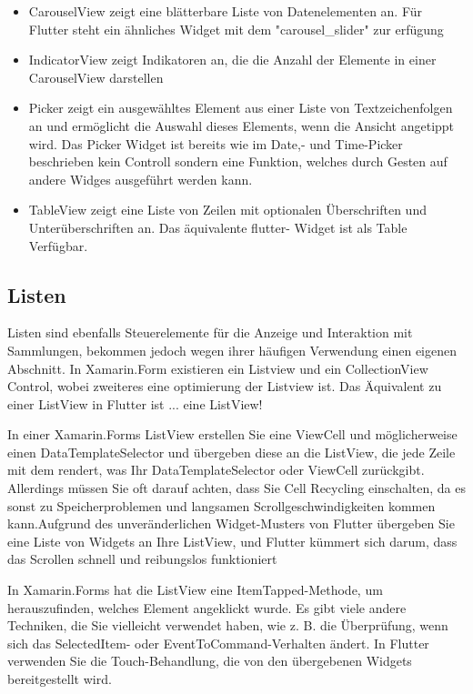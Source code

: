 \begin{itemize}
\setlength\itemsep{-0.6em}
 \item CarouselView zeigt eine blätterbare Liste von Datenelementen an.  Für Flutter steht ein ähnliches Widget mit dem "carousel\_slider" zur erfügung
 \item IndicatorView zeigt Indikatoren an, die die Anzahl der Elemente in einer CarouselView darstellen
 \item Picker zeigt ein ausgewähltes Element aus einer Liste von Textzeichenfolgen an und ermöglicht die Auswahl dieses Elements, wenn die Ansicht angetippt wird.  Das Picker Widget ist bereits wie im Date,- und Time-Picker beschrieben kein Controll sondern eine Funktion, welches durch Gesten auf andere Widges ausgeführt werden kann. 
 \item TableView zeigt eine Liste von Zeilen mit optionalen Überschriften und Unterüberschriften an.  Das äquivalente flutter- Widget ist als Table Verfügbar.
\end{itemize}

\subsection{Listen}

Listen sind ebenfalls Steuerelemente für die Anzeige und Interaktion mit Sammlungen,  bekommen jedoch wegen ihrer häufigen Verwendung einen eigenen Abschnitt. In Xamarin.Form existieren ein Listview und ein CollectionView Control,  wobei zweiteres eine optimierung der Listview ist.  Das Äquivalent zu einer ListView in Flutter ist ... eine ListView!

In einer Xamarin.Forms ListView erstellen Sie eine ViewCell und möglicherweise einen DataTemplateSelector und übergeben diese an die ListView, die jede Zeile mit dem rendert, was Ihr DataTemplateSelector oder ViewCell zurückgibt. Allerdings müssen Sie oft darauf achten, dass Sie Cell Recycling einschalten, da es sonst zu Speicherproblemen und langsamen Scrollgeschwindigkeiten kommen kann.Aufgrund des unveränderlichen Widget-Musters von Flutter übergeben Sie eine Liste von Widgets an Ihre ListView, und Flutter kümmert sich darum, dass das Scrollen schnell und reibungslos funktioniert

In Xamarin.Forms hat die ListView eine ItemTapped-Methode, um herauszufinden, welches Element angeklickt wurde. Es gibt viele andere Techniken, die Sie vielleicht verwendet haben, wie z. B. die Überprüfung, wenn sich das SelectedItem- oder EventToCommand-Verhalten ändert. In Flutter verwenden Sie die Touch-Behandlung, die von den übergebenen Widgets bereitgestellt wird.

